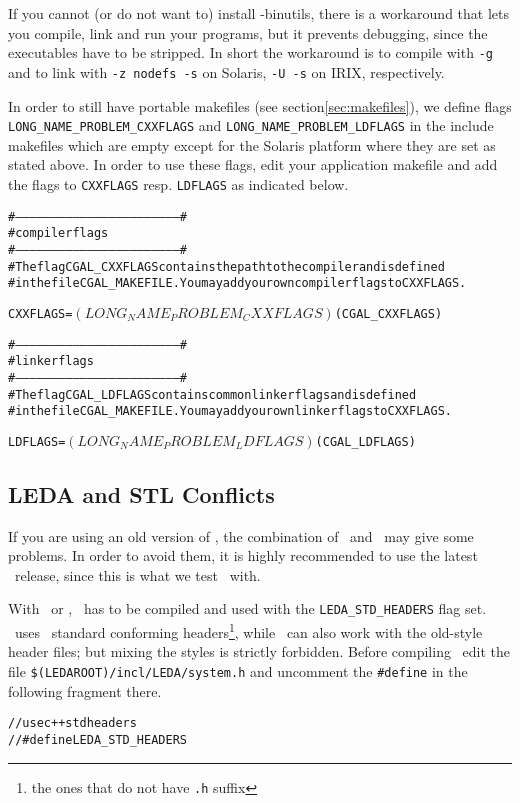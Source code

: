 If you cannot (or do not want to) install \gnu -binutils, there is a
workaround that lets you compile, link and run your programs, but it
prevents debugging, since the executables have to be stripped. In
short the workaround is to compile with \texttt{-g} and to link with
\texttt{-z nodefs -s} on Solaris, \texttt{-U -s} on IRIX,
respectively.

In order to still have portable makefiles (see
section\ref{sec:makefiles}), we define flags
\texttt{LONG\_NAME\_PROBLEM\_CXXFLAGS} and
\texttt{LONG\_NAME\_PROBLEM\_LDFLAGS} in the include makefiles which
are empty except for the Solaris platform where they are set as stated
above. In order to use these flags, edit your application makefile and
add the flags to \texttt{CXXFLAGS} resp. \texttt{LDFLAGS} as indicated
below.
\begin{alltt}
#---------------------------------------------------------------------#
#                    compiler flags
#---------------------------------------------------------------------#
# The flag CGAL_CXXFLAGS contains the path to the compiler and is defined
# in the file CGAL_MAKEFILE. You may add your own compiler flags to CXXFLAGS.

CXXFLAGS = $(LONG_NAME_PROBLEM_CXXFLAGS) $(CGAL_CXXFLAGS) 

#---------------------------------------------------------------------#
#                    linker flags
#---------------------------------------------------------------------#
# The flag CGAL_LDFLAGS contains common linker flags and is defined
# in the file CGAL_MAKEFILE. You may add your own linker flags to CXXFLAGS.

LDFLAGS = $(LONG_NAME_PROBLEM_LDFLAGS) $(CGAL_LDFLAGS) 
\end{alltt}

\subsection{LEDA and STL Conflicts\label{subs:ledastlconfl}}

If you are using an old version of \leda, the combination of \leda\ 
and \stl\ may give some problems. In order to avoid them, it is highly
recommended to use the latest \leda\ release, since this is what we
test \cgal\ with.

With \msvc\ or \bcc, \leda\ has to be compiled and used with the
\texttt{LEDA\_STD\_HEADERS} flag set. \cgal\ uses \CC\ standard
conforming headers\footnote{the ones that do not have \texttt{.h}
  suffix}, while \leda\ can also work with the old-style header files;
but mixing the styles is strictly forbidden. Before compiling \leda\,
edit the file \texttt{\$(LEDAROOT)/incl/LEDA/system.h} and uncomment
the \texttt{\#define} in the following fragment there.
\begin{alltt}
// use c++ std headers
//#define LEDA_STD_HEADERS
\end{alltt}

